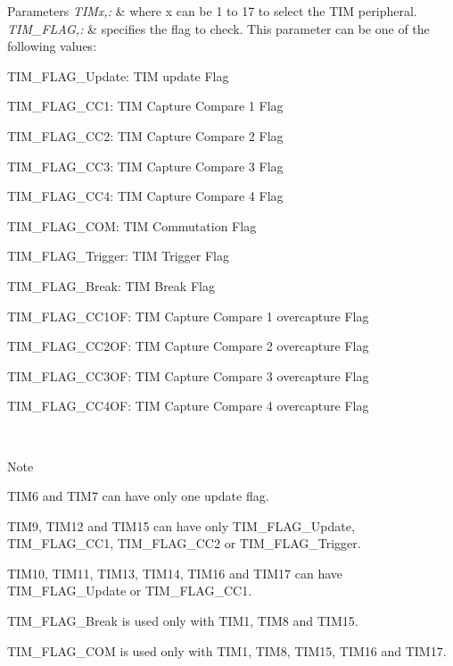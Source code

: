 \begin{DoxyParams}{Parameters}
{\em T\-I\-Mx,\-:} & where x can be 1 to 17 to select the T\-I\-M peripheral. \\
\hline
{\em T\-I\-M\-\_\-\-F\-L\-A\-G,\-:} & specifies the flag to check. This parameter can be one of the following values\-: \begin{DoxyItemize}
\item T\-I\-M\-\_\-\-F\-L\-A\-G\-\_\-\-Update\-: T\-I\-M update Flag \item T\-I\-M\-\_\-\-F\-L\-A\-G\-\_\-\-C\-C1\-: T\-I\-M Capture Compare 1 Flag \item T\-I\-M\-\_\-\-F\-L\-A\-G\-\_\-\-C\-C2\-: T\-I\-M Capture Compare 2 Flag \item T\-I\-M\-\_\-\-F\-L\-A\-G\-\_\-\-C\-C3\-: T\-I\-M Capture Compare 3 Flag \item T\-I\-M\-\_\-\-F\-L\-A\-G\-\_\-\-C\-C4\-: T\-I\-M Capture Compare 4 Flag \item T\-I\-M\-\_\-\-F\-L\-A\-G\-\_\-\-C\-O\-M\-: T\-I\-M Commutation Flag \item T\-I\-M\-\_\-\-F\-L\-A\-G\-\_\-\-Trigger\-: T\-I\-M Trigger Flag \item T\-I\-M\-\_\-\-F\-L\-A\-G\-\_\-\-Break\-: T\-I\-M Break Flag \item T\-I\-M\-\_\-\-F\-L\-A\-G\-\_\-\-C\-C1\-O\-F\-: T\-I\-M Capture Compare 1 overcapture Flag \item T\-I\-M\-\_\-\-F\-L\-A\-G\-\_\-\-C\-C2\-O\-F\-: T\-I\-M Capture Compare 2 overcapture Flag \item T\-I\-M\-\_\-\-F\-L\-A\-G\-\_\-\-C\-C3\-O\-F\-: T\-I\-M Capture Compare 3 overcapture Flag \item T\-I\-M\-\_\-\-F\-L\-A\-G\-\_\-\-C\-C4\-O\-F\-: T\-I\-M Capture Compare 4 overcapture Flag \end{DoxyItemize}
\\
\hline
\end{DoxyParams}
\begin{DoxyNote}{Note}

\begin{DoxyItemize}
\item T\-I\-M6 and T\-I\-M7 can have only one update flag.
\item T\-I\-M9, T\-I\-M12 and T\-I\-M15 can have only T\-I\-M\-\_\-\-F\-L\-A\-G\-\_\-\-Update, T\-I\-M\-\_\-\-F\-L\-A\-G\-\_\-\-C\-C1, T\-I\-M\-\_\-\-F\-L\-A\-G\-\_\-\-C\-C2 or T\-I\-M\-\_\-\-F\-L\-A\-G\-\_\-\-Trigger.
\item T\-I\-M10, T\-I\-M11, T\-I\-M13, T\-I\-M14, T\-I\-M16 and T\-I\-M17 can have T\-I\-M\-\_\-\-F\-L\-A\-G\-\_\-\-Update or T\-I\-M\-\_\-\-F\-L\-A\-G\-\_\-\-C\-C1.
\item T\-I\-M\-\_\-\-F\-L\-A\-G\-\_\-\-Break is used only with T\-I\-M1, T\-I\-M8 and T\-I\-M15.
\item T\-I\-M\-\_\-\-F\-L\-A\-G\-\_\-\-C\-O\-M is used only with T\-I\-M1, T\-I\-M8, T\-I\-M15, T\-I\-M16 and T\-I\-M17. 
\end{DoxyItemize}
\end{DoxyNote}

